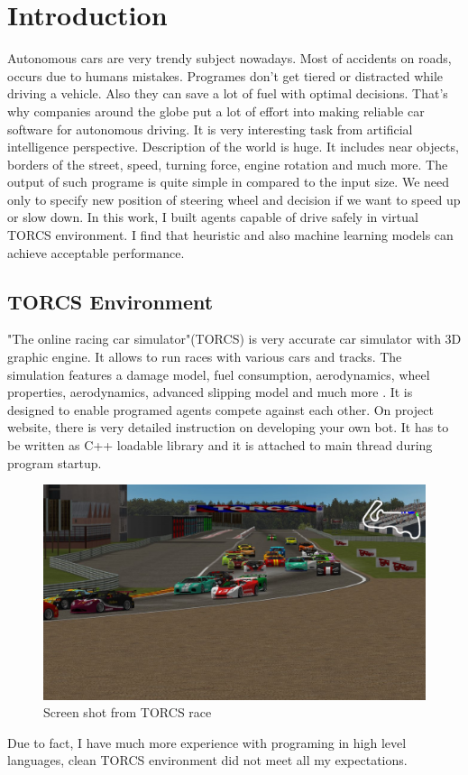 \documentclass[declaration,shortabstract,english,inz]{iithesis}
\author         {Kacper Kulczak}
\begin{document}


\chapter{Introduction}

Autonomous cars are very trendy subject nowadays.
Most of accidents on roads, occurs due to humans mistakes.
Programes don't get tiered or distracted while driving a vehicle.
Also they can save a lot of fuel with optimal decisions.
That's why companies around the globe put a lot of effort into making reliable car software for autonomous driving.
It is very interesting task from artificial intelligence perspective. Description of the world is huge.
It includes near objects, borders of the street, speed, turning force, engine rotation and much more.
The output of such programe is quite simple in compared to the input size.
We need only to specify new position of steering wheel and decision if we want to speed up or slow down.
In this work, I built agents  capable of drive safely in virtual TORCS environment. I find that heuristic and also machine learning models can achieve acceptable performance.



\section{TORCS Environment}
"The online racing car simulator"(TORCS) is very accurate car simulator with 3D graphic engine.
It allows to run races with various cars and tracks.
The simulation features a damage model, fuel consumption, aerodynamics, wheel properties, aerodynamics, advanced slipping model and much more \cite{TORCS}.
It is designed to enable programed agents compete against each other.
On project website, there is very detailed instruction on developing your own bot.
It has to be written as C++ loadable library and it is attached to main thread during program startup.


\begin{figure}[h]
    \includegraphics[width=\linewidth]{img/torcs_look.jpeg}
    \caption{Screen shot from TORCS race \cite{TORCS}}
    \label{fig:torcs}
\end{figure}
Due to fact, I have much more experience with programing in high level languages, clean TORCS environment did not meet all my expectations. 
\end{document}
